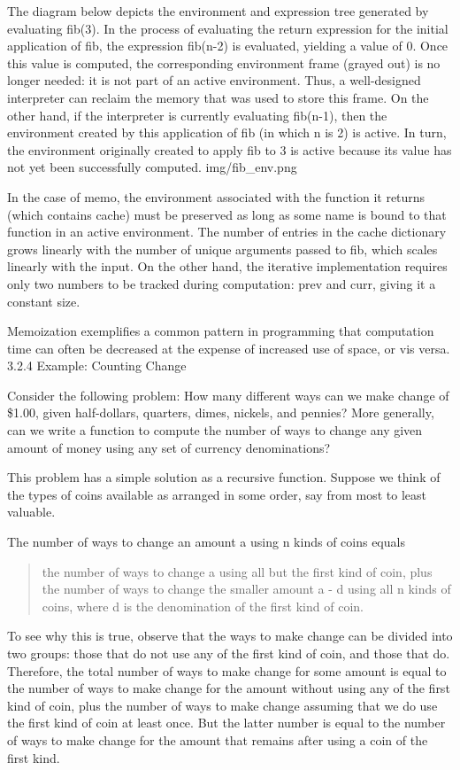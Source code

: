 \documentclass[letterpaper,10pt,dvipdfmx]{sphinxmanual}
\begin{document}
The diagram below depicts the environment and expression tree generated by evaluating fib(3). In the process of evaluating the return expression for the initial application of fib, the expression fib(n-2) is evaluated, yielding a value of 0. Once this value is computed, the corresponding environment frame (grayed out) is no longer needed: it is not part of an active environment. Thus, a well-designed interpreter can reclaim the memory that was used to store this frame. On the other hand, if the interpreter is currently evaluating fib(n-1), then the environment created by this application of fib (in which n is 2) is active. In turn, the environment originally created to apply fib to 3 is active because its value has not yet been successfully computed.
img/fib\_env.png

In the case of memo, the environment associated with the function it returns (which contains cache) must be preserved as long as some name is bound to that function in an active environment. The number of entries in the cache dictionary grows linearly with the number of unique arguments passed to fib, which scales linearly with the input. On the other hand, the iterative implementation requires only two numbers to be tracked during computation: prev and curr, giving it a constant size.

Memoization exemplifies a common pattern in programming that computation time can often be decreased at the expense of increased use of space, or vis versa.
3.2.4   Example: Counting Change

Consider the following problem: How many different ways can we make change of \$1.00, given half-dollars, quarters, dimes, nickels, and pennies? More generally, can we write a function to compute the number of ways to change any given amount of money using any set of currency denominations?

This problem has a simple solution as a recursive function. Suppose we think of the types of coins available as arranged in some order, say from most to least valuable.

The number of ways to change an amount a using n kinds of coins equals
\begin{quote}

the number of ways to change a using all but the first kind of coin, plus
the number of ways to change the smaller amount a - d using all n kinds of coins, where d is the denomination of the first kind of coin.
\end{quote}

To see why this is true, observe that the ways to make change can be divided into two groups: those that do not use any of the first kind of coin, and those that do. Therefore, the total number of ways to make change for some amount is equal to the number of ways to make change for the amount without using any of the first kind of coin, plus the number of ways to make change assuming that we do use the first kind of coin at least once. But the latter number is equal to the number of ways to make change for the amount that remains after using a coin of the first kind.
\end{document}
